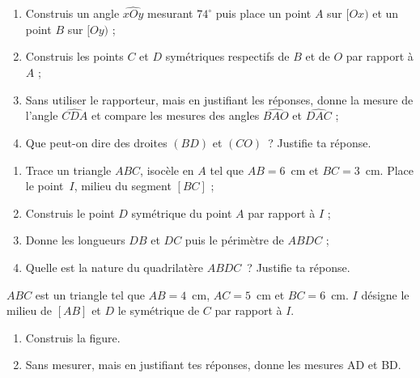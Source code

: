 \columnbreak

\begin{exercice}
\begin{enumerate}
 \item Construis un angle $\widehat{xOy}$ mesurant $74^\circ$ puis place un point $A$ sur $[Ox)$ et un point $B$ sur $[Oy)$ ;
 \item Construis les points $C$ et $D$ symétriques respectifs de $B$ et de $O$ par rapport à $A$ ;
 \item Sans utiliser le rapporteur, mais en justifiant les réponses, donne la mesure de l'angle $\widehat{CDA}$ et compare les mesures des angles $\widehat{BAO}$ et $\widehat{DAC}$ ;
 \item Que peut-on dire des droites $(BD)$ et $(CO)$ ? Justifie ta réponse.
 \end{enumerate}
\end{exercice}


\begin{exercice}
\begin{enumerate}
 \item Trace un triangle $ABC$, isocèle en $A$ tel que $AB = 6$ cm et $BC = 3$ cm. Place le point $I$, milieu du segment $[BC]$ ;
 \item Construis le point $D$ symétrique du point $A$ par rapport à $I$ ;
 \item Donne les longueurs $DB$ et $DC$ puis le périmètre de $ABDC$ ;
 \item Quelle est la nature du quadrilatère $ABDC$ ? Justifie ta réponse.
 \end{enumerate}
\end{exercice}


\begin{exercice}
$ABC$ est un triangle tel que $AB = 4$ cm, $AC = 5$ cm et $BC = 6$ cm. $I$ désigne le milieu de $[AB]$ et $D$ le symétrique de $C$ par rapport à $I$.
\begin{enumerate}
 \item Construis la figure.
 \item Sans mesurer, mais en justifiant tes réponses, donne les mesures AD et BD.
 \end{enumerate}
\end{exercice}
